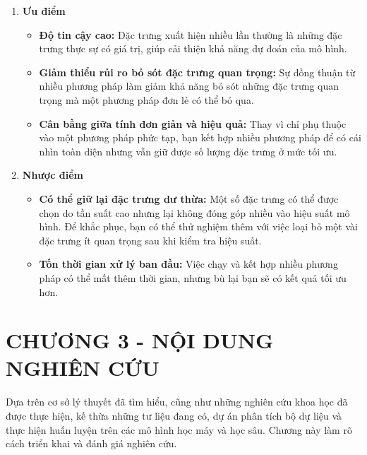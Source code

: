 \documentclass[13pt]{article}
\renewcommand{\thesubsection}{\thesection.\arabic{subsection}} %
\begin{document}
\begin{enumerate}
    \item \textbf{Ưu điểm}
    \begin{itemize}
        \item \textbf{Độ tin cậy cao: } Đặc trưng xuất hiện nhiều lần thường là những đặc trưng thực sự có giá trị, giúp cải thiện khả năng dự đoán của mô hình.
        \item \textbf{Giảm thiểu rủi ro bỏ sót đặc trưng quan trọng: } Sự đồng thuận từ nhiều phương pháp làm giảm khả năng bỏ sót những đặc trưng quan trọng mà một phương pháp đơn lẻ có thể bỏ qua.
        \item \textbf{Cân bằng giữa tính đơn giản và hiệu quả: } Thay vì chỉ phụ thuộc vào một phương pháp phức tạp, bạn kết hợp nhiều phương pháp để có cái nhìn toàn diện nhưng vẫn giữ được số lượng đặc trưng ở mức tối ưu.
    \end{itemize}
    
    \item \textbf{Nhược điểm}
    \begin{itemize}
        \item \textbf{Có thể giữ lại đặc trưng dư thừa: } Một số đặc trưng có thể được chọn do tần suất cao nhưng lại không đóng góp nhiều vào hiệu suất mô hình. Để khắc phục, bạn có thể thử nghiệm thêm với việc loại bỏ một vài đặc trưng ít quan trọng sau khi kiểm tra hiệu suất.
        \item \textbf{Tốn thời gian xử lý ban đầu: } Việc chạy và kết hợp nhiều phương pháp có thể mất thêm thời gian, nhưng bù lại bạn sẽ có kết quả tối ưu hơn.
    \end{itemize}
\end{enumerate}

\newpage
\renewcommand{\thesubsection}{\thesection.\arabic{subsection}} %
\setcounter{section}{3} %
\setcounter{subsection}{0}
\section*{CHƯƠNG 3 - NỘI DUNG NGHIÊN CỨU}
Dựa trên cơ sở lý thuyết đã tìm hiểu, cũng như những nghiên cứu khoa học đã được thực hiện, kế thừa những tư liệu đang có, dự án phân tích bộ dự liệu và thực hiện huấn luyện trên các mô hình học máy và học sâu. Chương này làm rõ cách triển khai và đánh giá nghiên cứu.
\end{document}
